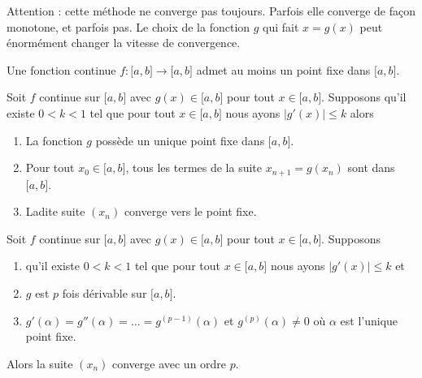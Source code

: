 Attention : cette méthode ne converge pas toujours. Parfois elle converge de façon monotone, et parfois pas. Le choix de la fonction \( g\) qui fait \( x=g(x)\) peut énormément changer la vitesse de convergence.

\begin{theorem}
    Une fonction continue \( f\colon \mathopen[ a , b \mathclose]\to \mathopen[ a , b \mathclose]\) admet au moins un point fixe dans \( \mathopen[ a , b \mathclose]\).
\end{theorem}

\begin{theorem}
    Soit \( f\) continue sur \( \mathopen[ a , b \mathclose]\) avec \( g(x)\in\mathopen[ a , b \mathclose]\) pour tout \( x\in\mathopen[ a , b \mathclose]\). Supposons qu'il existe \( 0<k<1\) tel que pour tout \( x\in\mathopen[ a , b \mathclose]\) nous ayons \( | g'(x) |\leq k\) alors
    \begin{enumerate}
        \item
            La fonction \( g\) possède un unique point fixe dans \( \mathopen[ a , b \mathclose]\).
        \item
            Pour tout \( x_0\in\mathopen[ a , b \mathclose]\), tous les termes de la suite \( x_{n+1}=g(x_n)\) sont dans \( \mathopen[ a , b \mathclose]\).
        \item
            Ladite suite \( (x_n)\) converge vers le point fixe.
    \end{enumerate}
\end{theorem}

\begin{theorem}
    Soit \( f\) continue sur \( \mathopen[ a , b \mathclose]\) avec \( g(x)\in\mathopen[ a , b \mathclose]\) pour tout \( x\in\mathopen[ a , b \mathclose]\). Supposons
    \begin{enumerate}
        \item
    qu'il existe \( 0<k<1\) tel que pour tout \( x\in\mathopen[ a , b \mathclose]\) nous ayons \( | g'(x) |\leq k\) et
\item
    \( g\) est \( p\) fois dérivable sur \( \mathopen[ a , b \mathclose]\).
\item
    \( g'(\alpha)=g''(\alpha)=\ldots=g^{(p-1)}(\alpha)\) et \( g^{(p)}(\alpha)\neq 0\) où \( \alpha\) est l'unique point fixe.
    \end{enumerate}
    Alors la suite \( (x_n)\) converge avec un ordre \( p\).
\end{theorem}



